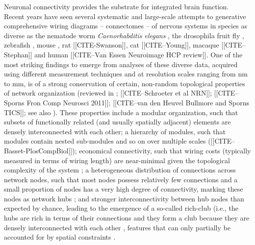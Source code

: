 \documentclass[10pt,letterpaper]{article}
\begin{document}
Neuronal connectivity provides the substrate for integrated brain function.
Recent years have seen several systematic and large-scale attempts to generative comprehensive wiring diagrams -- connectomes -- of nervous systems in species as diverse as the nematode worm \emph{Caenorhabditis elegans} \cite{White:1986tx, Varshney2011}, the drosophila fruit fly \cite{Chiang:2011, Shih:2015cu}, zebrafish \cite{Wanner:2016ea, Hildebrand:2017iu}, mouse \cite{Oh2014, Zingg:2014el}, rat [[CITE-Swanson]], cat [[CITE--Young]], macaque [[CITE--Stephan]]\cite{Markov:2012wu} and human \cite{Hagmann:2008gda} [[CITE--Van Essen Neuroimage HCP review]].
One of the most striking findings to emerge from analyses of these diverse data, acquired using different measurement techniques and at resolution scales ranging from nm to mm, is of a strong conservation of certain, non-random topological properties of network organization (reviewed in \cite{Bullmore:2009iv, Bullmore:2012vl}; [[CITE--Schroeter et al NRN]]; [[CITE--Sporns Fron Comp Neurosci 2011]]; [[CITE--van den Heuvel Bullmore and Sporns TICS]]; see also \cite{fornito2016book}).
These properties include a modular organization, such that subsets of functionally related (and usually spatially adjacent) elements are densely interconnected with each other;
a hierarchy of modules, such that modules contain nested sub-modules and so on over multiple scales (\cite{Meunier:2010hq}[[CITE--Basset-PlosCompBiol]]);
economical connectivity, such that wiring costs (typically measured in terms of wiring length) are near-minimal given the topological complexity of the system \cite{Betzel:2016jt, Bassett:2010hf};
a heterogeneous distribution of connections across network nodes, such that most nodes possess relatively few connections and a small proportion of nodes has a very high degree of connectivity, marking these nodes as network hubs \cite{vandenHeuvel:2013ge, Varshney:2011ju};
and stronger interconnectivity between hub nodes than expected by chance, leading to the emergence of a so-called rich-club (i.e., the hubs are rich in terms of their connections and they form a club because they are densely interconnected with each other \cite{vandenHeuvel:2011he, ZamoraLopez:2010hy, deReus:2013cy, Towlson:2013gf, Shih:2015cu}, features that can only partially be accounted for by spatial constraints \cite{Henderson:2014fg, Roberts:2016il, Horvat:2016ia}.
\end{document}
